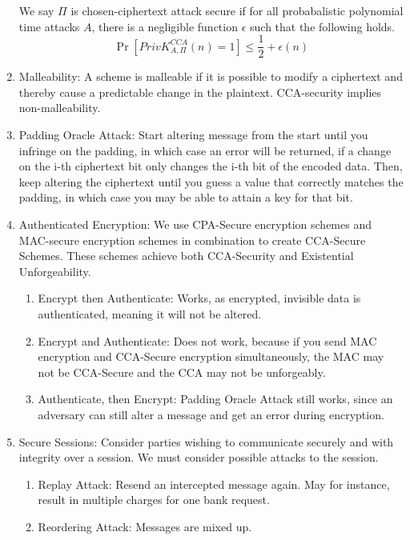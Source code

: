 \documentclass[12pt,letterpaper]{article}
\begin{document}
\begin{enumerate}
\begin{enumerate}
        \end{enumerate}
        We say $\Pi$ is chosen-ciphertext attack secure if for all probabalistic polynomial time attacks $A$, there is a negligible function $\epsilon$ such that the following holds.
        \[\Pr[PrivK^{CCA}_{A,\Pi}(n)=1]\leq\frac{1}{2}+\epsilon(n)\]
    \item Malleability: A scheme is malleable if it is possible to modify a ciphertext and thereby cause a predictable change in the plaintext.\bigskip\newline
        CCA-security implies non-malleability.
    \item Padding Oracle Attack: Start altering message from the start until you infringe on the padding, in which case an error will be returned, if a change on the i-th ciphertext bit only changes the i-th bit of the encoded data. Then, keep altering the ciphertext until you guess a value that correctly matches the padding, in which case you may be able to attain a key for that bit.\newpage
    \item Authenticated Encryption: We use CPA-Secure encryption schemes and MAC-secure encryption schemes in combination to create CCA-Secure Schemes. These schemes achieve both CCA-Security and Existential Unforgeability.
        \begin{enumerate}
            \item Encrypt then Authenticate: Works, as encrypted, invisible data is authenticated, meaning it will not be altered.
            \item Encrypt and Authenticate: Does not work, because if you send MAC encryption and CCA-Secure encryption simultaneously, the MAC may not be CCA-Secure and the CCA may not be unforgeably.
            \item Authenticate, then Encrypt: Padding Oracle Attack still works, since an adversary can still alter a message and get an error during encryption.
        \end{enumerate}
            \item Secure Sessions: Consider parties wishing to communicate securely and with integrity over a session. We must consider possible attacks to the session.
        \begin{enumerate}
            \item Replay Attack: Resend an intercepted message again. May for instance, result in multiple charges for one bank request.
            \item Reordering Attack: Messages are mixed up.

\end{enumerate}
\end{enumerate}
\end{document}
